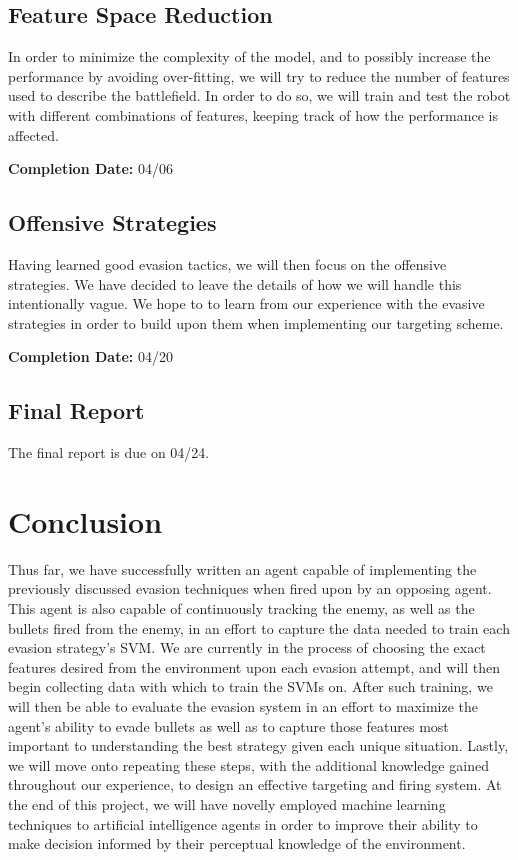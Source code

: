 \documentclass{article}
\theoremstyle{plain}
\theoremstyle{definition}
\theoremstyle{remark}
\begin{document}
\subsection*{Feature Space Reduction}
In order to minimize the complexity of the model, and to possibly increase the performance by avoiding over-fitting, we will try to reduce the number of features used to describe the battlefield. In order to do so, we will train and test the robot with different combinations of features, keeping track of how the performance is affected. 

{\bf Completion Date:}  04/06

\subsection*{Offensive Strategies}
Having learned good evasion tactics, we will then focus on the offensive strategies. We have decided to leave the details of how we will handle this intentionally vague. We hope to to learn from our experience with the evasive strategies in order to build upon them when implementing our targeting scheme. 

{\bf Completion Date:}  04/20

\subsection*{Final Report}
The final report is due on 04/24.

\section{Conclusion}

Thus far, we have successfully written an agent capable of implementing the previously discussed evasion techniques when fired upon by an opposing agent. This agent is also capable of continuously tracking the enemy, as well as the bullets fired from the enemy, in an effort to capture the data needed to train each evasion strategy's SVM. We are currently in the process of choosing the exact features desired from the environment upon each evasion attempt, and will then begin collecting data with which to train the SVMs on. After such training, we will then be able to evaluate the evasion system in an effort to maximize the agent's ability to evade bullets as well as to capture those features most important to understanding the best strategy given each unique situation. Lastly, we will move onto repeating these steps, with the additional knowledge gained throughout our experience, to design an effective targeting and firing system. At the end of this project, we will have novelly employed machine learning techniques to artificial intelligence agents in order to improve their ability to make decision informed by their perceptual knowledge of the environment.



\end{document}
